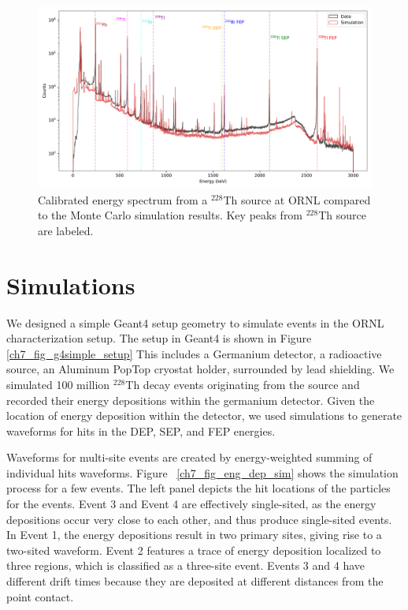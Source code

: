 \begin{figure}%
\centering
    \includegraphics[width=0.99\linewidth,trim={0pc 0pc 0pc 0pc},clip]{ch7/figs/energy_spectrum_comparison.pdf}
    \caption{Calibrated energy spectrum from a $^{228}$Th source at ORNL compared to the Monte Carlo simulation results. Key peaks from $^{228}$Th source are labeled.}
   \label{ch7_fig_eng_spec_comp}
\end{figure}

\section{Simulations}
We designed a simple Geant4 setup geometry to simulate events in the ORNL characterization setup. The setup in Geant4 is shown in Figure \ref{ch7_fig_g4simple_setup} This includes a Germanium detector, a radioactive source, an Aluminum PopTop cryostat holder, surrounded by lead shielding. We simulated 100 million $^{228}$Th decay events originating from the source and recorded their energy depositions within the germanium detector. Given the location of energy deposition within the detector, we used {\siggen} simulations to generate waveforms for hits in the DEP, SEP, and FEP energies.

Waveforms for multi-site events are created by energy-weighted summing of individual hits waveforms. Figure ~\ref{ch7_fig_eng_dep_sim} shows the simulation process for a few events. The left panel depicts the hit locations of the particles for the events. Event 3 and Event 4 are effectively single-sited, as the energy depositions occur very close to each other, and thus produce single-sited events. In Event 1, the energy depositions result in two primary sites, giving rise to a two-sited waveform. Event 2 features a trace of energy deposition localized to three regions, which is classified as a three-site event. Events 3 and 4 have different drift times because they are deposited at different distances from the point contact.

